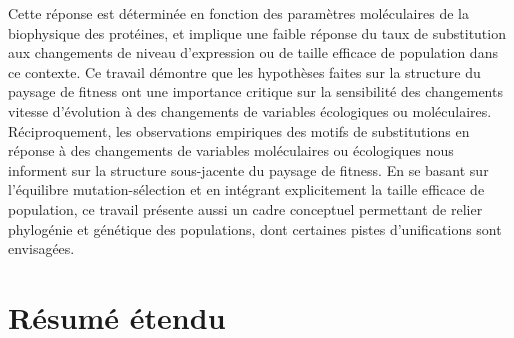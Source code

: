 Cette réponse est déterminée en fonction des paramètres moléculaires de la biophysique des protéines, et implique une faible réponse du taux de substitution aux changements de niveau d'expression ou de taille efficace de population dans ce contexte.
Ce travail démontre que les hypothèses faites sur la structure du paysage de fitness ont une importance critique sur la sensibilité des changements vitesse d'évolution à des changements de variables écologiques ou moléculaires.
Réciproquement, les observations empiriques des motifs de substitutions en réponse à des changements de variables moléculaires ou écologiques nous informent sur la structure sous-jacente du paysage de fitness.
En se basant sur l'équilibre mutation-sélection et en intégrant explicitement la taille efficace de population, ce travail présente aussi un cadre conceptuel permettant de relier phylogénie et génétique des populations, dont certaines pistes d'unifications sont envisagées.

\newpage
\section*{Résumé étendu}

